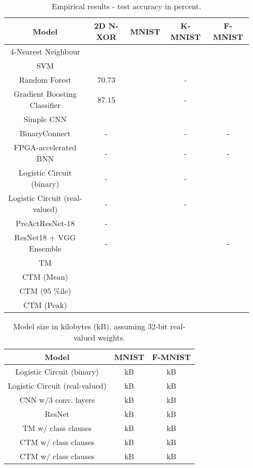 \documentclass{article}
\begin{document}
\begin{table*}[!!h]
\centering
\begin{tabular}{ c|c|c|c|c } 
\hline
Model & 2D N-XOR & MNIST & K-MNIST & F-MNIST\\
\hline
\hline
4-Nearest Neighbour \cite{Clanuwat2018,xiao2017}&&&&\\
SVM \cite{Clanuwat2018}&&&&\\
Random Forest \cite{LiangAAAI19}&70.73&&-&\\
Gradient Boosting Classifier \cite{xiao2017}&87.15&&-&\\
Simple CNN \cite{Clanuwat2018,LiangAAAI19}&&&&\\
BinaryConnect \cite{courbariaux2015binaryconnect}&-&&-&-\\
FPGA-accelerated BNN \cite{Lammie2019}&-&&-&-\\
Logistic Circuit (binary) \cite{LiangAAAI19}&-&&-&\\
Logistic Circuit (real-valued) \cite{LiangAAAI19}&-&&-&\\
PreActResNet-18 \cite{Clanuwat2018}&-&&&\\
ResNet18 + VGG Ensemble \cite{Clanuwat2018}&-&&&-\\
TM&&&&\\
\hline
CTM (Mean)&&&&\\
CTM (95 \%ile)&&&&\\
CTM (Peak)&&&&\\
\hline
\end{tabular}
\caption{Empirical results - test accuracy in percent.}\label{table:results}
\end{table*}

\begin{table*}[!!h]
\centering
\begin{tabular}{ c|c|c } 
\hline
Model & MNIST & F-MNIST\\
\hline
\hline
Logistic Circuit (binary) \cite{LiangAAAI19}& kB& kB\\
Logistic Circuit (real-valued) \cite{LiangAAAI19}& kB& kB\\
CNN w/3 conv. layers \cite{LiangAAAI19}& kB& kB\\
ResNet \cite{LiangAAAI19}& kB& kB\\
TM w/ class clauses& kB& kB\\
\hline
CTM w/ class clauses& kB& kB\\
CTM w/ class clauses& kB& kB\\
\hline
\end{tabular}
\caption{Model size in kilobytes (kB), assuming 32-bit real-valued weights.}\label{table:model_size}
\end{table*}
\end{document}
